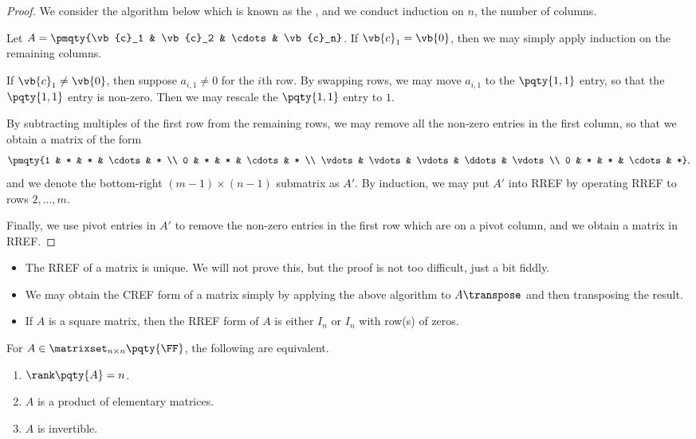 \begin{proof}
    We consider the algorithm below which is known as the , and we conduct induction on \(n\), the number of columns.

    Let \(A = \pmqty{\vb{c}_1 & \vb{c}_2 & \cdots & \vb{c}_n}\). If \(\vb{c}_1 = \vb{0}\), then we may simply apply induction on the remaining columns.

    If \(\vb{c}_1 \neq \vb{0}\), then suppose \(a_{i, 1} \neq 0\) for the \(i\)th row. By swapping rows, we may move \(a_{i, 1}\) to the \(\pqty{1, 1}\) entry, so that the \(\pqty{1, 1}\) entry is non-zero. Then we may rescale the \(\pqty{1, 1}\) entry to \(1\).

    By subtracting multiples of the first row from the remaining rows, we may remove all the non-zero entries in the first column, so that we obtain a matrix of the form
    \[
        \pmqty{1 & * & * & \cdots & * \\ 0 & * & * & \cdots & * \\ \vdots & \vdots & \vdots & \ddots & \vdots \\ 0 & * & * & \cdots & *},
    \]
    and we denote the bottom-right \((m - 1) \times (n - 1)\) submatrix as \(A'\). By induction, we may put \(A'\) into RREF by operating RREF to rows \(2, \ldots, m\). 

    Finally, we use pivot entries in \(A'\) to remove the non-zero entries in the first row which are on a pivot column, and we obtain a matrix in RREF.
\end{proof}

\begin{remarks}
    \begin{itemize}
        \item The RREF of a matrix is unique. We will not prove this, but the proof is not too difficult, just a bit fiddly.
        \item We may obtain the CREF form of a matrix simply by applying the above algorithm to \(A\transpose\) and then transposing the result.
        \item If \(A\) is a square matrix, then the RREF form of \(A\) is either \(I_n\) or \(I_n\) with row(s) of zeros.
    \end{itemize}
\end{remarks}

\begin{theorem}
    For \(A \in \matrixset_{n \times n} \pqty{\FF}\), the following are equivalent.
    \begin{enumerate}[label=(\roman*)]
        \item \(\rank\pqty{A} = n\).
        \item \(A\) is a product of elementary matrices.
        \item \(A\) is invertible.
    \end{enumerate}
\end{theorem}

